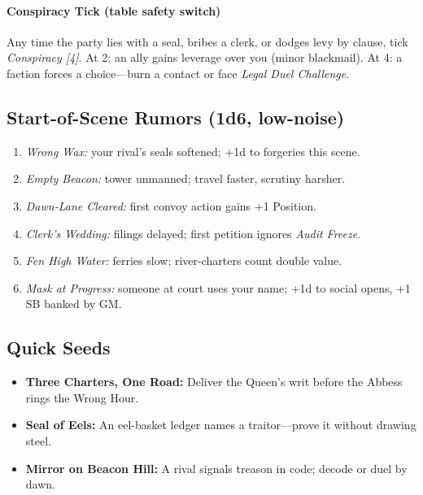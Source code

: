 \paragraph*{Conspiracy Tick (table safety switch)}
Any time the party lies with a seal, bribes a clerk, or dodges levy by clause, tick \emph{Conspiracy [4]}.  
At 2: an ally gains leverage over you (minor blackmail).  
At 4: a faction forces a choice—burn a contact or face \emph{Legal Duel Challenge}.

\subsection*{Start-of-Scene Rumors (1d6, low-noise)}
\begin{enumerate}
  \item \emph{Wrong Wax:} your rival’s seals softened; +1d to forgeries this scene.
  \item \emph{Empty Beacon:} tower unmanned; travel faster, scrutiny harsher.
  \item \emph{Dawn-Lane Cleared:} first convoy action gains +1 Position.
  \item \emph{Clerk’s Wedding:} filings delayed; first petition ignores \emph{Audit Freeze}.
  \item \emph{Fen High Water:} ferries slow; river-charters count double value.
  \item \emph{Mask at Progress:} someone at court uses your name; +1d to social opens, +1 SB banked by GM.
\end{enumerate}

\subsection*{Quick Seeds}
\begin{itemize}
  \item \textbf{Three Charters, One Road:} Deliver the Queen’s writ before the Abbess rings the Wrong Hour.
  \item \textbf{Seal of Eels:} An eel-basket ledger names a traitor—prove it without drawing steel.
  \item \textbf{Mirror on Beacon Hill:} A rival signals treason in code; decode or duel by dawn.
\end{itemize}